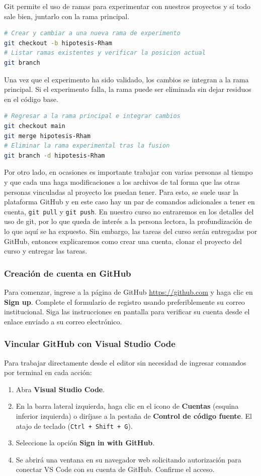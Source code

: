 \documentclass[12pt]{article}
\begin{document}
Git permite el uso de ramas para experimentar con nuestros proyectos y sí 
todo sale bien, juntarlo con la rama principal. 
\begin{lstlisting}[language=bash]
# Crear y cambiar a una nueva rama de experimento
git checkout -b hipotesis-Rham		
# Listar ramas existentes y verificar la posicion actual
git branch
\end{lstlisting}
Una vez que el experimento ha sido validado, los cambios se 
integran a la rama principal. 
Si el experimento falla, la rama puede ser eliminada sin 
dejar residuos en el código base.
\begin{lstlisting}[language=bash]
# Regresar a la rama principal e integrar cambios
git checkout main
git merge hipotesis-Rham	
# Eliminar la rama experimental tras la fusion
git branch -d hipotesis-Rham	
\end{lstlisting}

Por otro lado, en ocasiones es importante trabajar con varias personas
al tiempo y que cada una haga modificaciones a los archivos de tal forma que 
las otras personas vinculadas al proyecto los puedan tener.
Para esto, se suele usar la plataforma GitHub y en este caso hay un par de comandos
adicionales a tener en cuenta, \lstinline|git pull| y \lstinline|git push|.
En nuestro curso no entraremos en los detalles del uso de git, por lo que 
queda de interés a la persona lectora, la profundización de lo que aquí se 
ha expuesto. Sin embargo, las tareas del curso serán entregadas por GitHub, 
entonces explicaremos como crear una cuenta, clonar el proyecto del curso y 
entregar las tareas.

\subsubsection*{Creación de cuenta en GitHub}
Para comenzar, ingrese a la página de GitHub \href{https://github.com}{https://github.com} 
y haga clic en \textbf{Sign up}. Complete el formulario de registro 
usando preferiblemente su correo institucional. 
Siga las instrucciones en pantalla para verificar su cuenta desde 
el enlace enviado a su correo electrónico.

\subsubsection*{Vincular GitHub con Visual Studio Code}
Para trabajar directamente desde el editor sin necesidad de ingresar 
comandos por terminal en cada acción:
\begin{enumerate}
\item Abra \textbf{Visual Studio Code}.
\item En la barra lateral izquierda, haga clic en el icono de \textbf{Cuentas} 
(esquina inferior izquierda) o diríjase a la pestaña de 
\textbf{Control de código fuente}. El atajo de teclado (\lstinline|Ctrl + Shift + G|).
\item Seleccione la opción \textbf{Sign in with GitHub}.
\item Se abrirá una ventana en su navegador web solicitando autorización para conectar VS Code con su cuenta de GitHub. Confirme el acceso.
\end{enumerate}
\end{document}
